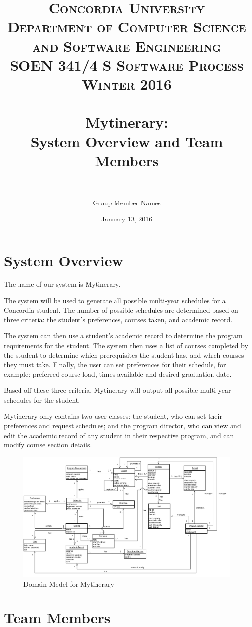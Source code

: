 \documentclass[paper=a4, fontsize=11pt, oneside]{scrartcl} %
\title{	
\normalfont \normalsize 
\textsc{Concordia University} \\
\textsc{Department of Computer Science and Software Engineering} \\
\textsc{SOEN 341/4 S \qquad Software Process \qquad Winter 2016} \\ [25pt] %
\horrule{0.5pt} \\[0.4cm] %
\huge Mytinerary: \\ System Overview and Team Members \\ %
\horrule{2pt} \\[0.5cm] %
}
\author{Group Member Names} %
\date{\normalsize January 13, 2016} %
\begin{document}
\maketitle %


\section*{System Overview}
The name of our system is Mytinerary.

The system will be used to generate all possible multi-year schedules for a Concordia student.
The number of possible schedules are determined based on three criteria: the student's preferences, courses taken, and academic record.

The system can then use a student's academic record to determine the program requirements for the student.
The system then uses a list of courses completed by the student to determine which prerequisites the student has, and which courses they must take.
Finally, the user can set preferences for their schedule, for example: preferred course load, times available and desired graduation date.

Based off these three criteria, Mytinerary will output all possible  multi-year schedules for the student.

Mytinerary only contains two user classes: the student, who can set their preferences and request schedules; and the program director, who can view and edit the academic record of any student in their respective program, and can modify course section details.
\begin{figure}[H]
\centering
\includegraphics[width=1.4\textwidth, angle=-90]{domain_model}
\caption{Domain Model for Mytinerary}
\label{fig:DM}
\end{figure}

\newpage
\section*{Team Members}
\end{document}
